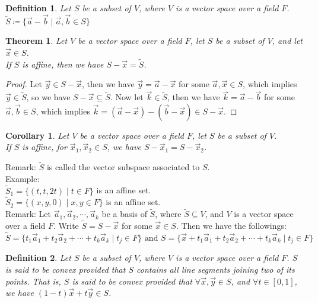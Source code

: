 \documentclass[15pt]{book}
\theoremstyle{break}
\theoremstyle{break}
\newtheorem{thm}{Theorem}[section]
\newtheorem{corT}[lem]{Corollary}
\newtheorem{defn}{Definition}[corL]
\newcommand{\remark}{\color{blue}Remark: \color{black}}
\newcommand{\example}{\color{green}Example: \color{black}}
\begin{document}
\begin{defn}
Let $S$ be a subset of $V$, where $V$ is a vector space over a field $F$. $\widetilde{S} \coloneqq \{\vec{a}-\vec{b} \mid \vec{a},\vec{b}\in S\}$
\end{defn}

\begin{thm}
Let $V$ be a vector space over a field $F$, let $S$ be a subset of $V$, and let $\vec{x}\in S$.\\ If $S$ is affine, then we have $S - \vec{x} = \widetilde{S}$.
\end{thm}
\begin{proof}
Let $\vec{y}\in S-\vec{x}$, then we have $\vec{y} = \vec{a} - \vec{x}$ for some $\vec{a}, \vec{x}\in S$, which implies $\vec{y} \in \widetilde{S}$, so we have $S-\vec{x} \subseteq \widetilde{S}$. Now let $\vec{k} \in \widetilde{S}$, then we have $\vec{k} = \vec{a}-\vec{b}$ for some $\vec{a},\vec{b}\in S$, which implies $\vec{k} = (\vec{a}-\vec{x})-(\vec{b}-\vec{x})\in S-\vec{x}$.
\end{proof}

\begin{corT}
Let $V$ be a vector space over a field $F$, let $S$ be a subset of $V$.\\ If $S$ is affine, for $\vec{x}_1,\vec{x}_2 \in S$, we have $S-\vec{x}_1 = S-\vec{x}_2$.
\end{corT}

\remark $\widetilde{S}$ is called the vector subspace associated to $S$.\\

\example\\
$\widetilde{S}_1 = \{(t,t,2t)\mid t\in F\}$ is an affine set.\\
$\widetilde{S}_2 = \{(x,y,0)\mid x,y \in F\}$ is an affine set.\\


\remark Let $\vec{a}_1,\vec{a}_2,\cdots, \vec{a}_k$ be a basis of $\widetilde{S}$, where $\widetilde{S}\subseteq V$, and $V$ is a vector space over a field $F$. Write $\widetilde{S} = S - \vec{x}$ for some $\vec{x}\in S$. Then we have the followings: 
$$\widetilde{S} = \{ t_1 \vec{a}_1+t_2\vec{a}_2+\cdots+t_k\vec{a}_k\mid t_j \in F\} \text{ and } S = \{ \vec{x} + t_1 \vec{a}_1+t_2\vec{a}_2+\cdots+t_k\vec{a}_k\mid t_j \in F\}$$

\begin{defn}
Let $S$ be a subset of $V$, where $V$ is a vector space over a field $F$. $S$ is said to be convex provided that $S$ contains all line segments joining two of its points. That is, $S$ is said to be convex provided that $\forall \vec{x},\vec{y}\in S$, and $\forall t \in [0,1]$, we have $(1-t)\vec{x}+t\vec{y}\in S$.
\end{defn}
\end{document}
